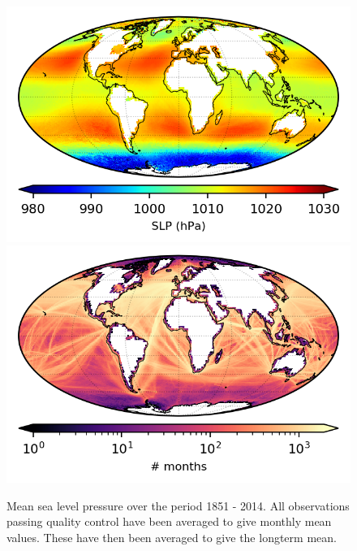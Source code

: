 \begin{figure}[h]
    \includegraphics{resources/observations-slp-mean-map-optimal.png}
    \includegraphics{resources/observations-slp-months-map-optimal.png}    
    \caption{Mean sea level pressure over the period 1851 - 2014. All observations passing quality control have been averaged to give monthly mean values. These have then been averaged to give the longterm mean.}
    \label{fig:slp-map}
\end{figure}
\FloatBarrier

